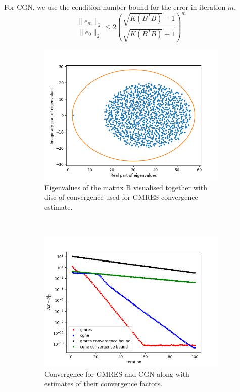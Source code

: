 For CGN, we use the condition number bound for the error in iteration $m$,
\begin{equation}
\frac{\|e_m\|_2}{\|e_0\|_2}\leq 2\left(\frac{\sqrt{K(B^TB)}-1}{\sqrt{K(B^TB)}+1}\right)^m
\end{equation}
\begin{figure}[h!]
	\centering
	\begin{subfigure}[t]{0.49\textwidth}
		\includegraphics[width=\textwidth]{Eigens.png}
		\caption{Eigenvalues of the matrix B visualised together with disc of convergence used for GMRES convergence estimate.}
	\end{subfigure}~
	\begin{subfigure}[t]{0.49\textwidth}
		\includegraphics[width=\textwidth]{error_bound.png}
		\caption{Convergence for GMRES and CGN along with estimates of their convergence factors.}
	\end{subfigure}
	\caption{}
	\label{task6b}
\end{figure}

